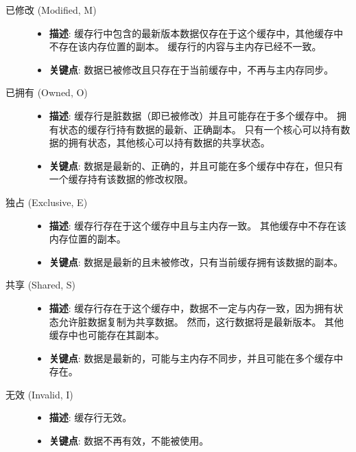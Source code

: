 \begin{description}
\item [已修改 (Modified, M)] \hfill
\begin{itemize}
\item
  \textbf{描述}:
  缓存行中包含的最新版本数据仅存在于这个缓存中，其他缓存中不存在该内存位置的副本。
  缓存行的内容与主内存已经不一致。
\item
  \textbf{关键点}: 数据已被修改且只存在于当前缓存中，不再与主内存同步。
\end{itemize}

\item [{已拥有 (Owned, O)}] \hfill
\begin{itemize}
\item
  \textbf{描述}:
  缓存行是脏数据（即已被修改）并且可能存在于多个缓存中。
  拥有状态的缓存行持有数据的最新、正确副本。
  只有一个核心可以持有数据的拥有状态，其他核心可以持有数据的共享状态。
\item
  \textbf{关键点}:
  数据是最新的、正确的，并且可能在多个缓存中存在，但只有一个缓存持有该数据的修改权限。
\end{itemize}

\item [{独占 (Exclusive, E)}] \hfill
\begin{itemize}

\item
  \textbf{描述}:
  缓存行存在于这个缓存中且与主内存一致。
  其他缓存中不存在该内存位置的副本。
\item
  \textbf{关键点}:
  数据是最新的且未被修改，只有当前缓存拥有该数据的副本。
\end{itemize}

\item [{共享 (Shared, S)}] \hfill
\begin{itemize}
\item
  \textbf{描述}:
  缓存行存在于这个缓存中，数据不一定与内存一致，因为拥有状态允许脏数据复制为共享数据。
  然而，这行数据将是最新版本。
  其他缓存中也可能存在其副本。
\item
  \textbf{关键点}:
  数据是最新的，可能与主内存不同步，并且可能在多个缓存中存在。
\end{itemize}

\item[{无效 (Invalid, I)}] \hfill
\begin{itemize}
\item
  \textbf{描述}: 缓存行无效。
\item
  \textbf{关键点}: 数据不再有效，不能被使用。
\end{itemize}

\end{description}

